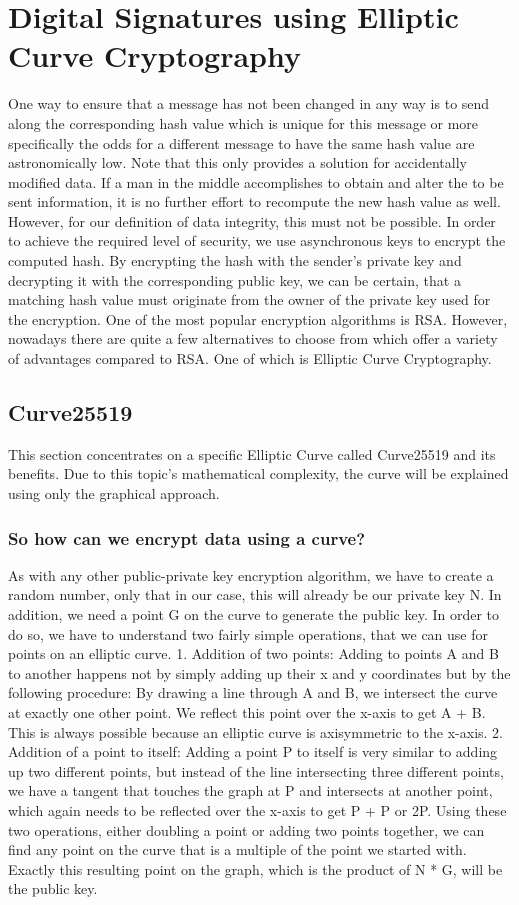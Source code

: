 \section{Digital Signatures using Elliptic Curve Cryptography}

One way to ensure that a message has not been changed in any way is to send along the corresponding hash value which is unique for this message or more specifically the odds for a different message to have the same hash value are astronomically low. Note that this only provides a solution for accidentally modified data. If a man in the middle accomplishes to obtain and alter the to be sent information, it is no further effort to recompute the new hash value as well. However, for our definition of data integrity, this must not be possible. In order to achieve the required level of security, we use asynchronous keys to encrypt the computed hash. By encrypting the hash with the sender’s private key and decrypting it with the corresponding public key, we can be certain, that a matching hash value must originate from the owner of the private key used for the encryption. 
One of the most popular encryption algorithms is RSA. However, nowadays there are quite a few alternatives to choose from which offer a variety of advantages compared to RSA. One of which is Elliptic Curve Cryptography. 

\subsection{Curve25519}
This section concentrates on a specific Elliptic Curve called Curve25519 and its benefits.
Due to this topic's mathematical complexity, the curve will be explained using only the graphical approach.

\subsubsection{So how can we encrypt data using a curve?}
As with any other public-private key encryption algorithm, we have to create a random number, only that in our case, this will already be our private key N. In addition, we need a point G on the curve to generate the public key. In order to do so, we have to understand two fairly simple operations, that we can use for points on an elliptic curve.
1. Addition of two points: Adding to points A and B to another happens not by simply adding up their x and y coordinates but by the following procedure: By drawing a line through A and B, we intersect the curve at exactly one other point. We reflect this point over the x-axis to get A + B. This is always possible because an elliptic curve is axisymmetric to the x-axis.
2. Addition of a point to itself: Adding a point P to itself is very similar to adding up two different points, but instead of the line intersecting three different points, we have a tangent that touches the graph at P and intersects at another point, which again needs to be reflected over the x-axis to get P + P or 2P.
Using these two operations, either doubling a point or adding two points together, we can find any point on the curve that is a multiple of the point we started with. Exactly this resulting point on the graph, which is the product of N * G, will be the public key.

